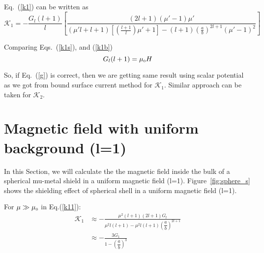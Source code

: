 Eq.~(\ref{k1}) can be written as
\begin{equation}\label{k1b}
\mathcal{K}_1=-\frac{G_l (l+1)}{l}\left[\frac{(2l+1)(\mu'-1)\mu'}{(\mu'l+l+1)\left[\left(\frac{l+1}{l}\right)\mu'+1\right]-(l+1)\left(\frac{a}{b}\right)^{2l+1}(\mu'-1)^2}\right]
\end{equation}

Comparing Eqs.~(\ref{k1s}), and (\ref{k1b})
\begin{equation}\label{g}
G_l(l+1)=\mu_{\scriptscriptstyle 0} H
\end{equation}

So, if Eq.~(\ref{g}) is correct, then we are getting same result using scalar potential as we got from bound surface current method for $\mathcal{K}_1$. Similar approach can be taken for $\mathcal{K}_2$.


\section{Magnetic field with uniform background (l=1)}\label{sec:uniform}


In this Section, we will calculate the the magnetic field inside the bulk of a spherical mu-metal shield in a uniform magnetic field (l=1). Figure~\ref{fig:sphere_s} shows the shielding effect of spherical shell in a uniform magnetic field (l=1). 

For \(\mu\gg\mu_{\scriptscriptstyle 0}\) in Eq.(\ref{k11}):
\begin{equation}\label{k12}
\begin{split}
\mathcal{K}_1 & \approx-\frac{\mu^2(l+1) (2l+1)G_l}{\mu^2 l(l+1)-\mu^2 l(l+1)\left(\dfrac{a}{b}\right)^{2l+1}}\\
& \approx-\frac{3 G_1}{1-\left(\dfrac{a}{b}\right)^{3}}
\end{split}
\end{equation}

